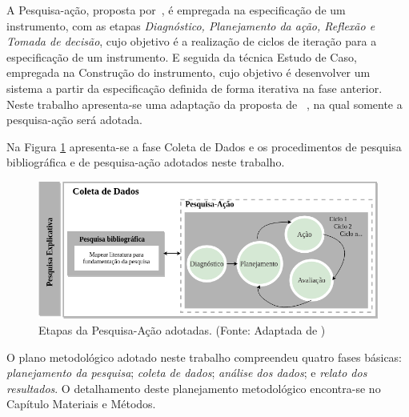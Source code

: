 A Pesquisa-ação, proposta por~\cite{petersen2008systematic}, é empregada na especificação de um instrumento, com as etapas \textit{Diagnóstico, Planejamento da ação, Reflexão e Tomada de decisão}, cujo objetivo é a realização de ciclos de iteração para a especificação de um instrumento. E seguida da técnica Estudo de Caso, empregada na Construção do instrumento, cujo objetivo é desenvolver um sistema a partir da especificação definida de forma iterativa na fase anterior. Neste trabalho apresenta-se uma adaptação da proposta de ~\cite{petersen2008systematic}, na qual somente a pesquisa-ação será adotada.

Na Figura \ref{fig:etapasPesquisaAcaoAdotas} apresenta-se a fase Coleta de Dados e os procedimentos de pesquisa bibliográfica e de pesquisa-ação adotados neste trabalho.

        \begin{figure}[H]
          \centering
          \includegraphics[width=12cm]{figuras/etapasPesquisaAcaoAdotadas.png}
          \caption{Etapas da Pesquisa-Ação adotadas. (Fonte: Adaptada de \cite{petersen2008systematic})} 
          \label{fig:etapasPesquisaAcaoAdotas}
        
        \end{figure}

O plano metodológico adotado neste trabalho compreendeu quatro fases básicas: \textit{planejamento da pesquisa}; \textit{coleta de dados}; \textit{análise dos dados}; e \textit{relato dos resultados}. O detalhamento deste planejamento metodológico encontra-se no Capítulo Materiais e Métodos.



